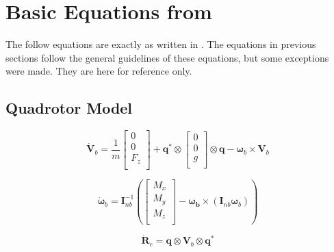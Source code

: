 \documentclass{article}
\numberwithin{equation}{section} %
\begin{document}
\section{Basic Equations from \cite{stingu09}}

The follow equations are exactly as written in \cite{stingu09}. The equations in previous sections follow the general guidelines of these equations, but some exceptions were made. They are here for reference only.

\subsection{Quadrotor Model}

\begin{equation}
\dot{\boldsymbol{V}}_b = \frac{1}{m} 
	\left[
		\begin{array}{c}
			0 \\
			0 \\
			F_z \\
		\end{array}
	\right]
	+ \boldsymbol{q}^* \otimes
		\left[
			\begin{array}{c}
				0 \\
				0 \\
				g \\
			\end{array}
		\right]
	\otimes \boldsymbol{q} - \boldsymbol{\omega}_b \times \boldsymbol{V}_b
\end{equation}

\begin{equation}
\dot{\boldsymbol{\omega}}_b = \boldsymbol{I}^{-1}_{nb}
	\left(
		\left[
			\begin{array}{c}
				M_x \\
				M_y \\
				M_z \\
			\end{array}
		\right]
		- \boldsymbol{\omega_b} \times \left( \boldsymbol{I}_{nb} \boldsymbol{\omega}_b \right)
	\right)
\end{equation}

\begin{equation}
\dot{\boldsymbol{R}}_e = \boldsymbol{q} \otimes \boldsymbol{V}_b \otimes \boldsymbol{q}^*
\end{equation}
\end{document}
